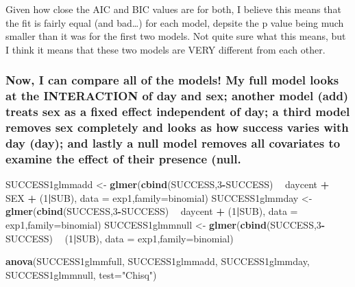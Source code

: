\documentclass[]{article}
\newenvironment{Shaded}{\begin{snugshade}}{\end{snugshade}}
\newcommand{\KeywordTok}[1]{\textcolor[rgb]{0.13,0.29,0.53}{\textbf{#1}}}
\newcommand{\DataTypeTok}[1]{\textcolor[rgb]{0.13,0.29,0.53}{#1}}
\newcommand{\DecValTok}[1]{\textcolor[rgb]{0.00,0.00,0.81}{#1}}
\newcommand{\StringTok}[1]{\textcolor[rgb]{0.31,0.60,0.02}{#1}}
\newcommand{\OperatorTok}[1]{\textcolor[rgb]{0.81,0.36,0.00}{\textbf{#1}}}
\newcommand{\NormalTok}[1]{#1}
\begin{document}
Given how close the AIC and BIC values are for both, I believe this
means that the fit is fairly equal (and bad\ldots{}) for each model,
depsite the p value being much smaller than it was for the first two
models. Not quite sure what this means, but I think it means that these
two models are VERY different from each other.

\subsubsection{Now, I can compare all of the models! My full model looks
at the INTERACTION of day and sex; another model (add) treats sex as a
fixed effect independent of day; a third model removes sex completely
and looks as how success varies with day (day); and lastly a null model
removes all covariates to examine the effect of their presence
(null.}\label{now-i-can-compare-all-of-the-models-my-full-model-looks-at-the-interaction-of-day-and-sex-another-model-add-treats-sex-as-a-fixed-effect-independent-of-day-a-third-model-removes-sex-completely-and-looks-as-how-success-varies-with-day-day-and-lastly-a-null-model-removes-all-covariates-to-examine-the-effect-of-their-presence-null.}

\begin{Shaded}
\begin{Highlighting}[]
\NormalTok{SUCCESS1glmmadd <-}\StringTok{ }\KeywordTok{glmer}\NormalTok{(}\KeywordTok{cbind}\NormalTok{(SUCCESS,}\DecValTok{3}\OperatorTok{-}\NormalTok{SUCCESS) }\OperatorTok{~}\StringTok{ }\NormalTok{daycent }\OperatorTok{+}\StringTok{ }\NormalTok{SEX }\OperatorTok{+}\StringTok{ }\NormalTok{(}\DecValTok{1}\OperatorTok{|}\NormalTok{SUB), }\DataTypeTok{data =}\NormalTok{ exp1,}\DataTypeTok{family=}\NormalTok{binomial)}
\NormalTok{SUCCESS1glmmday <-}\StringTok{ }\KeywordTok{glmer}\NormalTok{(}\KeywordTok{cbind}\NormalTok{(SUCCESS,}\DecValTok{3}\OperatorTok{-}\NormalTok{SUCCESS) }\OperatorTok{~}\StringTok{ }\NormalTok{daycent }\OperatorTok{+}\StringTok{ }\NormalTok{(}\DecValTok{1}\OperatorTok{|}\NormalTok{SUB), }\DataTypeTok{data =}\NormalTok{ exp1,}\DataTypeTok{family=}\NormalTok{binomial)}
\NormalTok{SUCCESS1glmmnull <-}\StringTok{ }\KeywordTok{glmer}\NormalTok{(}\KeywordTok{cbind}\NormalTok{(SUCCESS,}\DecValTok{3}\OperatorTok{-}\NormalTok{SUCCESS) }\OperatorTok{~}\StringTok{ }\NormalTok{(}\DecValTok{1}\OperatorTok{|}\NormalTok{SUB), }\DataTypeTok{data =}\NormalTok{ exp1,}\DataTypeTok{family=}\NormalTok{binomial)}

\KeywordTok{anova}\NormalTok{(SUCCESS1glmmfull, SUCCESS1glmmadd, SUCCESS1glmmday, SUCCESS1glmmnull, }\DataTypeTok{test=}\StringTok{"Chisq"}\NormalTok{)}
\end{Highlighting}
\end{Shaded}
\end{document}
